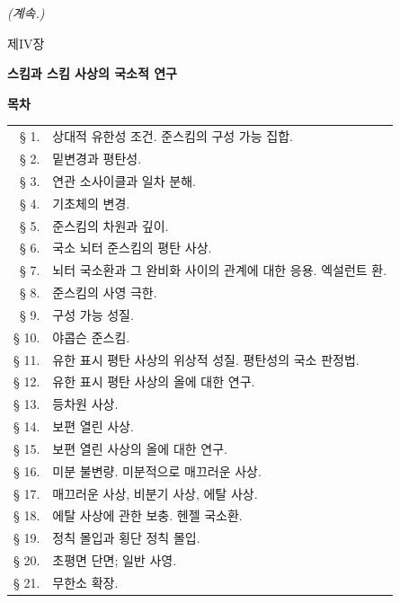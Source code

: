 \begin{flushright}
\emph{(계속.)}
\end{flushright}

\cleardoublepage
{}
\thispagestyle{plain}

\begin{center}
{\Large 제IV장}

\vspace{1.5cm}
{\LARGE\bfseries 스킴과 스킴 사상의 국소적 연구}

\vspace{1.5cm}
{\large\bfseries 목차}
\end{center}

\medskip
\begin{tabular}{@{}r p{}}
§ 1. & 상대적 유한성 조건. 준스킴의 구성 가능 집합.\\
§ 2. & 밑변경과 평탄성.\\
§ 3. & 연관 소사이클과 일차 분해.\\
§ 4. & 기초체의 변경.\\
§ 5. & 준스킴의 차원과 깊이.\\
§ 6. & 국소 뇌터 준스킴의 평탄 사상.\\
§ 7. & 뇌터 국소환과 그 완비화 사이의 관계에 대한 응용. 엑설런트 환.\\
§ 8. & 준스킴의 사영 극한.\\
§ 9. & 구성 가능 성질.\\
§ 10. & 야콥슨 준스킴.\\
§ 11.\footnotemark[1] & 유한 표시 평탄 사상의 위상적 성질. 평탄성의 국소 판정법.\\
§ 12. & 유한 표시 평탄 사상의 올에 대한 연구.\\
§ 13. & 등차원 사상.\\
§ 14. & 보편 열린 사상.\\
§ 15. & 보편 열린 사상의 올에 대한 연구.\\
§ 16. & 미분 불변량. 미분적으로 매끄러운 사상.\\
§ 17. & 매끄러운 사상, 비분기 사상, 에탈 사상.\\
§ 18. & 에탈 사상에 관한 보충. 헨젤 국소환.\\
§ 19. & 정칙 몰입과 횡단 정칙 몰입.\\
§ 20. & 초평면 단면; 일반 사영.\\
§ 21. & 무한소 확장.\\
\end{tabular}


